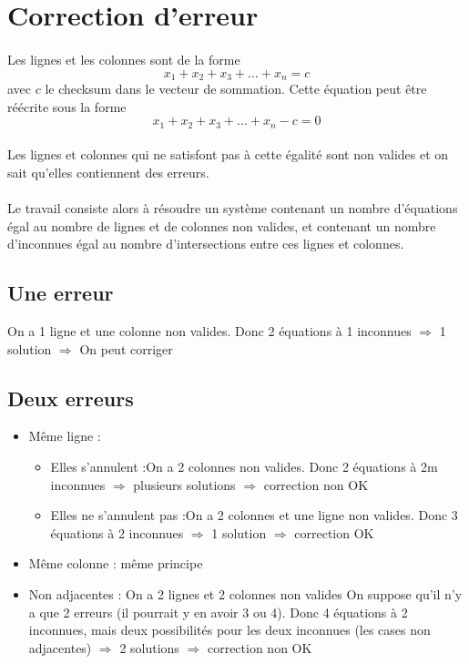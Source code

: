 \documentclass[a4paper,12pt]{report}
\begin{document}
\section{Correction d'erreur}
\paragraph*{}
  Les lignes et les colonnes sont de la forme \[ x_1 + x_2 + x_3 + \ldots + x_n = c \]
  avec $c$ le checksum dans le vecteur de sommation.\newline
  Cette équation peut être réécrite sous la forme  \[ x_1 + x_2 + x_3 + \ldots + x_n - c = 0 \]
\paragraph*{}
  Les lignes et colonnes qui ne satisfont pas à cette égalité sont non valides et on sait
  qu’elles contiennent des erreurs.
\paragraph*{}
  Le travail consiste alors à résoudre un système contenant un nombre d’équations égal au
  nombre de lignes et de colonnes non valides, et contenant un nombre d’inconnues égal
  au nombre d’intersections entre ces lignes et colonnes.

\subsection{Une erreur}
On a 1 ligne et une colonne non valides.
Donc 2 équations à 1 inconnues $\Rightarrow$ 1 solution $\Rightarrow$ On peut corriger
\subsection{Deux erreurs}
\begin{itemize}
  \item Même ligne :
    \begin{itemize}
      \item Elles s’annulent :\newline On a 2 colonnes non valides.\newline
      Donc 2 équations à 2m inconnues $\Rightarrow$ plusieurs solutions $\Rightarrow$ correction non OK
      \item Elles ne s’annulent pas :\newline On a 2 colonnes et une ligne non valides.\newline
      Donc 3 équations à 2 inconnues $\Rightarrow$ 1 solution $\Rightarrow$ correction OK
    \end{itemize}
  \item Même colonne : même principe
  \item Non adjacentes : \newline On a 2 lignes et 2 colonnes non valides \newline
  On suppose qu'il n'y a que 2 erreurs (il pourrait y en avoir 3 ou 4).\newline
  Donc 4 équations à 2 inconnues, mais deux possibilités pour les deux inconnues
  (les cases non adjacentes) $\Rightarrow$ 2 solutions $\Rightarrow$ correction non OK

\end{itemize}
\end{document}

